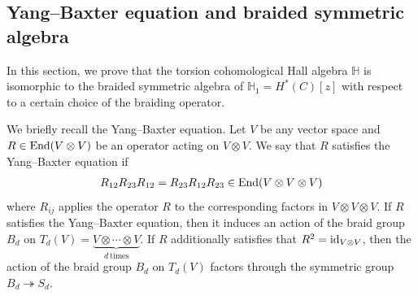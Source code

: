 \documentclass[10pt]{amsart}
\newcommand{\BH}{\mathbb{H}}
\newcommand{\End}{\textnormal{End}}
\newcommand{\id}{\textnormal{id}}
\newcommand{\+}{{}^+}
\theoremstyle{definition}
\theoremstyle {definition}
\theoremstyle {definition}
\begin{document}
\subsection{Yang--Baxter equation and braided symmetric algebra} 

In this section, we prove that the torsion cohomological Hall algebra $\BH$ is isomorphic to the braided symmetric algebra of $\BH_1=H^*(C)[z]$ with respect to a certain choice of the braiding operator.

We briefly recall the Yang--Baxter equation. Let $V$ be any vector space and $R\in \End(V\otimes V)$ be an operator acting on $V\otimes V$. We say that $R$ satisfies the Yang--Baxter equation if 
\begin{align}\label{equation: Yang--Baxter}
 R_{12}R_{23}R_{12}=R_{23}R_{12}R_{23}\in \End(V\otimes V\otimes V)
\end{align}
where $R_{ij}$ applies the operator $R$ to the corresponding factors in $V\otimes V\otimes V$. If $R$ satisfies the Yang--Baxter equation, then it induces an action of the braid group $B_d$ on $T_d(V)=\underbrace{V \otimes \cdots \otimes V}_{d \ \mathrm{times}}$. If $R$ additionally satisfies that $R^2=\id_{V\otimes V}$, then the action of the braid group $B_d$ on $T_d(V)$ factors through the symmetric group $B_d\twoheadrightarrow S_d$. 
\end{document}
